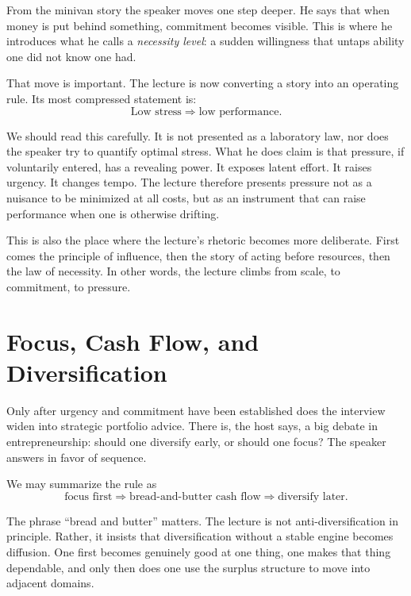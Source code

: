 From the minivan story the speaker moves one step deeper. He says that when money is put behind something, commitment becomes visible. This is where he introduces what he calls a \emph{necessity level}: a sudden willingness that untaps ability one did not know one had.

That move is important. The lecture is now converting a story into an operating rule. Its most compressed statement is:
\begin{equation}
\text{Low stress} \Longrightarrow \text{low performance}.
\end{equation}

We should read this carefully. It is not presented as a laboratory law, nor does the speaker try to quantify optimal stress. What he does claim is that pressure, if voluntarily entered, has a revealing power. It exposes latent effort. It raises urgency. It changes tempo. The lecture therefore presents pressure not as a nuisance to be minimized at all costs, but as an instrument that can raise performance when one is otherwise drifting.

This is also the place where the lecture's rhetoric becomes more deliberate. First comes the principle of influence, then the story of acting before resources, then the law of necessity. In other words, the lecture climbs from scale, to commitment, to pressure.

\section{Focus, Cash Flow, and Diversification}

Only after urgency and commitment have been established does the interview widen into strategic portfolio advice. There is, the host says, a big debate in entrepreneurship: should one diversify early, or should one focus? The speaker answers in favor of sequence.

We may summarize the rule as
\begin{equation}
\text{focus first}
\Longrightarrow
\text{bread-and-butter cash flow}
\Longrightarrow
\text{diversify later}.
\end{equation}

The phrase ``bread and butter'' matters. The lecture is not anti-diversification in principle. Rather, it insists that diversification without a stable engine becomes diffusion. One first becomes genuinely good at one thing, one makes that thing dependable, and only then does one use the surplus structure to move into adjacent domains.

